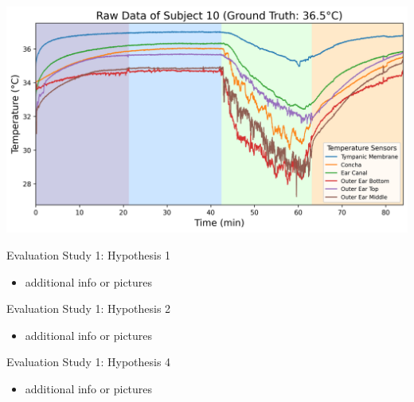 \documentclass[en]{sdqbeamer}
\begin{document}
\begin{frame}
    \begin{center}
        \includegraphics[width=0.9\linewidth]{../thesis-doc/images/study1/Logging_person_10_0smoothed_raw_data.png} %
    \end{center}
\end{frame}

\begin{frame}{Evaluation Study 1: Hypothesis 1}
    \begin{itemize}
        \item additional info or pictures
    \end{itemize}
\end{frame}

\begin{frame}{Evaluation Study 1: Hypothesis 2}
    \begin{itemize}
        \item additional info or pictures
    \end{itemize}
\end{frame}


\begin{frame}{Evaluation Study 1: Hypothesis 4}
    \begin{itemize}
        \item additional info or pictures
    \end{itemize}
\end{frame}
\end{document}
